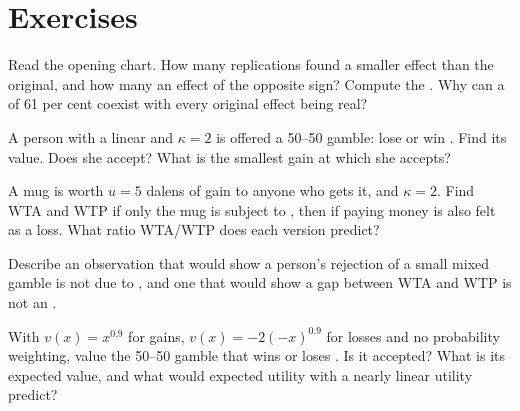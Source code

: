 \section{Exercises}\label{sec:b2:behavioural-evidence:exercises}

\begin{exercise}[$\star$]\label{exo:b2:behavioural-evidence:1}
Read the opening chart. How many replications found a smaller effect than the original, and how many an
effect of the opposite sign? Compute the . Why can a  of 61 per cent
coexist with every original effect being real?
\end{exercise}

\begin{exercise}[$\star$]\label{exo:b2:behavioural-evidence:2}
A person with a linear  and $\kappa = 2$ is offered a 50--50 gamble: lose  or win
. Find its value. Does she accept? What is the smallest gain at which she accepts?
\end{exercise}

\begin{exercise}[$\star$]\label{exo:b2:behavioural-evidence:3}
A mug is worth $u = 5$ dalens of gain to anyone who gets it, and $\kappa = 2$. Find WTA and WTP if only
the mug is subject to , then if paying money is also felt as a loss. What ratio WTA/WTP does
each version predict?
\end{exercise}

\begin{exercise}[$\star$]\label{exo:b2:behavioural-evidence:4}
Describe an observation that would show a person's rejection of a small mixed gamble is not due to , and one that would show a gap between WTA and WTP is not an .
\end{exercise}

\begin{exercise}[$\star\star$]\label{exo:b2:behavioural-evidence:5}
With $v(x) = x^{0.9}$ for gains, $v(x) = -2(-x)^{0.9}$ for losses and no probability weighting, value the
50--50 gamble that wins  or loses . Is it accepted? What is its expected value, and
what would expected utility with a nearly linear utility predict?
\end{exercise}

